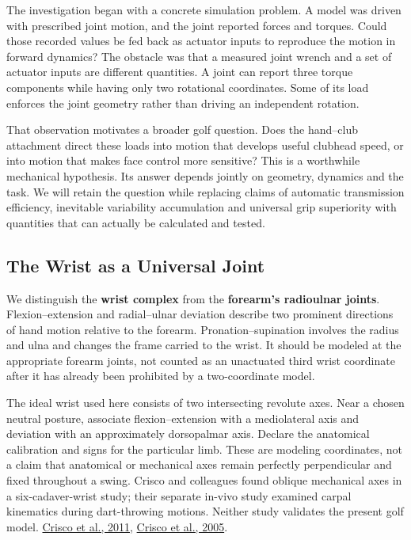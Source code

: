 \documentclass[
  11pt,
]{article}
\begin{document}
The investigation began with a concrete simulation problem. A model was
driven with prescribed joint motion, and the joint reported forces and
torques. Could those recorded values be fed back as actuator inputs to
reproduce the motion in forward dynamics? The obstacle was that a
measured joint wrench and a set of actuator inputs are different
quantities. A joint can report three torque components while having only
two rotational coordinates. Some of its load enforces the joint geometry
rather than driving an independent rotation.

That observation motivates a broader golf question. Does the hand--club
attachment direct these loads into motion that develops useful clubhead
speed, or into motion that makes face control more sensitive? This is a
worthwhile mechanical hypothesis. Its answer depends jointly on
geometry, dynamics and the task. We will retain the question while
replacing claims of automatic transmission efficiency, inevitable
variability accumulation and universal grip superiority with quantities
that can actually be calculated and tested.

\subsection{The Wrist as a Universal
Joint}\label{the-wrist-as-a-universal-joint}

We distinguish the \textbf{wrist complex} from the \textbf{forearm's
radioulnar joints}. Flexion--extension and radial--ulnar deviation
describe two prominent directions of hand motion relative to the
forearm. Pronation--supination involves the radius and ulna and changes
the frame carried to the wrist. It should be modeled at the appropriate
forearm joints, not counted as an unactuated third wrist coordinate
after it has already been prohibited by a two-coordinate model.

The ideal wrist used here consists of two intersecting revolute axes.
Near a chosen neutral posture, associate flexion--extension with a
mediolateral axis and deviation with an approximately dorsopalmar axis.
Declare the anatomical calibration and signs for the particular limb.
These are modeling coordinates, not a claim that anatomical or
mechanical axes remain perfectly perpendicular and fixed throughout a
swing. Crisco and colleagues found oblique mechanical axes in a
six-cadaver-wrist study; their separate in-vivo study examined carpal
kinematics during dart-throwing motions. Neither study validates the
present golf model.
\href{https://pubmed.ncbi.nlm.nih.gov/21248214/}{Crisco et al., 2011},
\href{https://pubmed.ncbi.nlm.nih.gov/16322624/}{Crisco et al., 2005}.
\end{document}
